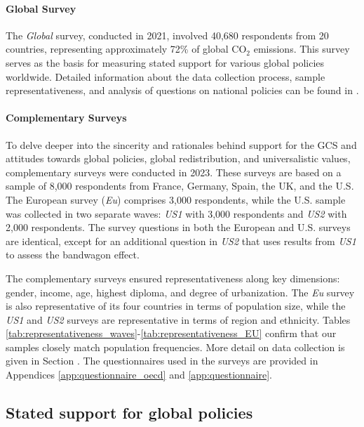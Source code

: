 \paragraph{Global Survey}

The \textit{Global} survey, conducted in 2021, involved 40,680 respondents from 20 countries, representing approximately 72\% of global CO$_\text{2}$ emissions. This survey serves as the basis for measuring stated support for various global policies worldwide. Detailed information about the data collection process, sample representativeness, and analysis of questions on national policies can be found in \citet{dechezlepretre_fighting_2022}.

\paragraph{Complementary Surveys}\label{par:surveys}

To delve deeper into the sincerity and rationales behind support for the GCS and attitudes towards global policies, global redistribution, and universalistic values, complementary surveys were conducted in 2023. These surveys are based on a sample of 8,000 respondents from France, Germany, Spain, the UK, and the U.S. The European survey (\textit{Eu}) comprises 3,000 respondents, while the U.S. sample was collected in two separate waves: \textit{US1} with 3,000 respondents and \textit{US2} with 2,000 respondents. The survey questions in both the European and U.S. surveys are identical, except for an additional question in \textit{US2} that uses results from \textit{US1} to assess the bandwagon effect.

The complementary surveys ensured representativeness along key dimensions: gender, income, age, highest diploma, and degree of urbanization. The \textit{Eu} survey is also representative of its four countries in terms of population size, while the \textit{US1} and \textit{US2} surveys are representative in terms of region and ethnicity. Tables \ref{tab:representativeness_waves}-\ref{tab:representativeness_EU} confirm that our samples closely match population frequencies. More detail on data collection is given in Section . The questionnaires used in the surveys are provided in Appendices \ref{app:questionnaire_oecd} and \ref{app:questionnaire}.

\subsection{Stated support for global policies}\label{subsec:stated_support}
